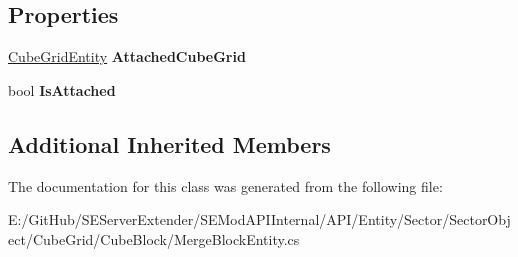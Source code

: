 \subsection*{Properties}
\begin{DoxyCompactItemize}
\item 
\hypertarget{class_s_e_mod_a_p_i_internal_1_1_a_p_i_1_1_entity_1_1_sector_1_1_sector_object_1_1_cube_grid_1_15c3f321f9502c29c7df9fbd0ea065d76_abc2fb332f5e0b8e3def21a619413c23e}{}\hyperlink{class_s_e_mod_a_p_i_internal_1_1_a_p_i_1_1_entity_1_1_sector_1_1_sector_object_1_1_cube_grid_entity}{Cube\+Grid\+Entity} {\bfseries Attached\+Cube\+Grid}\label{class_s_e_mod_a_p_i_internal_1_1_a_p_i_1_1_entity_1_1_sector_1_1_sector_object_1_1_cube_grid_1_15c3f321f9502c29c7df9fbd0ea065d76_abc2fb332f5e0b8e3def21a619413c23e}

\item 
\hypertarget{class_s_e_mod_a_p_i_internal_1_1_a_p_i_1_1_entity_1_1_sector_1_1_sector_object_1_1_cube_grid_1_15c3f321f9502c29c7df9fbd0ea065d76_ad5858d1f6856b78998068e44cb8c45d7}{}bool {\bfseries Is\+Attached}\label{class_s_e_mod_a_p_i_internal_1_1_a_p_i_1_1_entity_1_1_sector_1_1_sector_object_1_1_cube_grid_1_15c3f321f9502c29c7df9fbd0ea065d76_ad5858d1f6856b78998068e44cb8c45d7}

\end{DoxyCompactItemize}
\subsection*{Additional Inherited Members}


The documentation for this class was generated from the following file\+:\begin{DoxyCompactItemize}
\item 
E\+:/\+Git\+Hub/\+S\+E\+Server\+Extender/\+S\+E\+Mod\+A\+P\+I\+Internal/\+A\+P\+I/\+Entity/\+Sector/\+Sector\+Object/\+Cube\+Grid/\+Cube\+Block/Merge\+Block\+Entity.\+cs\end{DoxyCompactItemize}
